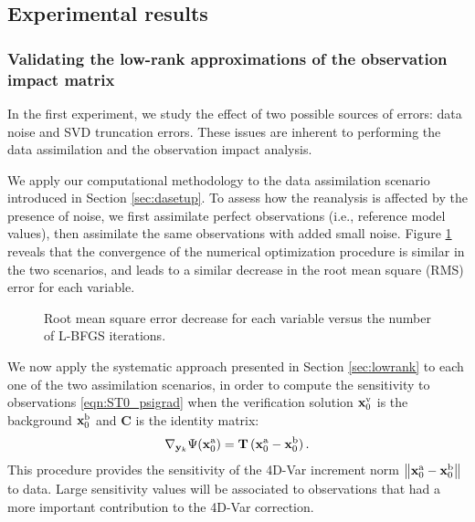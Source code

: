 \documentclass[final,sort&compress]{elsarticle}
\newcommand{\T}{\mathbf{T}}
\newcommand{\C}{\mathbf{C}}
\newcommand{\xb}{ \mathbf{x}^{\rm b} }
\newcommand{\xa}{ \mathbf{x}^{\rm a} }
\newcommand{\xv}{ \mathbf{x}^{\rm v} }
\newcommand{\y}{ \mathbf{y} }
\begin{document}
\subsection{Experimental results}


\subsubsection{Validating the low-rank approximations of the observation impact matrix}


In the first experiment, we study the effect of two possible sources of errors: data noise and SVD truncation errors.
These issues are inherent to performing the data assimilation and the observation impact analysis.

We apply our computational methodology to the data assimilation scenario introduced in Section \ref{sec:dasetup}. 
To assess how the reanalysis is affected by the presence of noise,
we first assimilate perfect observations (i.e., reference model values), then assimilate the same observations with added small noise. 
Figure \ref{fig:4dvar_perfvspert} reveals that the convergence of the numerical optimization procedure is similar in the two scenarios,
and leads to a similar decrease in the root mean square (RMS) error for each variable.



\begin{figure}
\setcounter{subfigure}{0}
\centering
\caption{Root mean square error decrease for each variable versus the number of L-BFGS iterations.}
 \label{fig:4dvar_perfvspert}
\end{figure}

We now apply the systematic approach presented in Section \ref{sec:lowrank} to each one of the two assimilation scenarios,
in order to compute the sensitivity to observations \eqref{eqn:ST0_psigrad}  when the verification solution $\xv_0$ is 
the background $\xb_0$ and $\C$ is the identity matrix:
\begin{align}
  \nabla_{\y_k} \Psi(\xa_0) = \T\, (\xa_0 - \xb_0 )\,.
 \label{eqn:OI_invobsimp}
 \end{align}
This procedure provides the sensitivity of the 4D-Var increment norm $\left\Vert \xa_0 - \xb_0 \right\Vert$ to data.
Large sensitivity values will be associated to observations that had a more important contribution to the 4D-Var correction.
\end{document}

